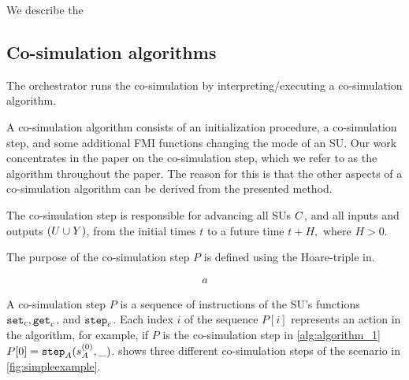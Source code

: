 We describe the 

\subsection{Co-simulation algorithms}\label{sc:cosimalgo}
The orchestrator runs the co-simulation by interpreting/executing a co-simulation algorithm.

A co-simulation algorithm consists of an initialization procedure, a co-simulation step, and some additional FMI functions changing the mode of an SU.
Our work concentrates in the paper on the co-simulation step, which we refer to as the algorithm throughout the paper. 
The reason for this is that the other aspects of a co-simulation algorithm can be derived from the presented method.  

The co-simulation step is responsible for advancing all SUs $C$, and all inputs and outputs $(U \cup Y)$, from the initial times $t$ to a future time $t+H, \textrm{ where } H > 0$.

The purpose of the co-simulation step $P$ is defined using the Hoare-triple in.

\begin{align*}
a
\end{align*}

A co-simulation step $P$ is a sequence of instructions of the SU's functions $\mathtt{set}_{c},\mathtt{get}_{c}$, and $\mathtt{step}_{c}$. 
Each index $i$ of the sequence $P[i]$ represents an action in the algorithm, for example, if $P$ is the co-simulation step in \cref{alg:algorithm_1} $P[0] = \mathtt{step}_{A}(s_{A}^{(0)}, \_)$.  shows three different co-simulation steps of the scenario in \cref{fig:simpleexample}. 

